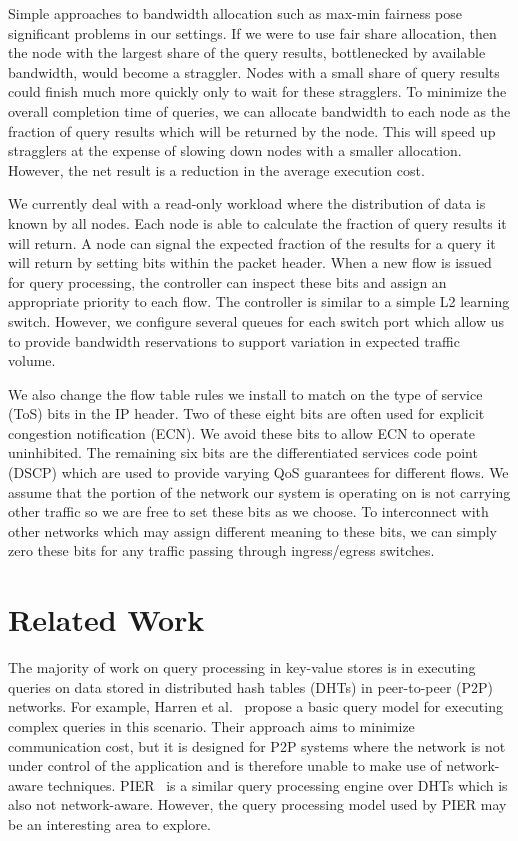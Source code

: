 \documentclass{sig-alternate-2013}
\begin{document}
Simple approaches to bandwidth allocation such as max-min fairness pose significant problems in our settings.
If we were to use fair share allocation, then the node with the largest share of the query results, bottlenecked by available bandwidth, would become a straggler.
Nodes with a small share of query results could finish much more quickly only to wait for these stragglers.
To minimize the overall completion time of queries, we can allocate bandwidth to each node as the fraction of query results which will be returned by the node.
This will speed up stragglers at the expense of slowing down nodes with a smaller allocation.
However, the net result is a reduction in the average execution cost.

We currently deal with a read-only workload where the distribution of data is known by all nodes.
Each node is able to calculate the fraction of query results it will return.
A node can signal the expected fraction of the results for a query it will return by setting bits within the packet header.
When a new flow is issued for query processing, the controller can inspect these bits and assign an appropriate priority to each flow.
The controller is similar to a simple L2 learning switch.
However, we configure several queues for each switch port which allow us to provide bandwidth reservations to support variation in expected traffic volume.

We also change the flow table rules we install to match on the type of service (ToS) bits in the IP header.
Two of these eight bits are often used for explicit congestion notification (ECN).
We avoid these bits to allow ECN to operate uninhibited.
The remaining six bits are the differentiated services code point (DSCP) which are used to provide varying QoS guarantees for different flows.
We assume that the portion of the network our system is operating on is not carrying other traffic so we are free to set these bits as we choose.
To interconnect with other networks which may assign different meaning to these bits, we can simply zero these bits for any traffic passing through ingress/egress switches.

\section{Related Work}

The majority of work on query processing in key-value stores is in executing queries on data stored in distributed hash tables (DHTs) in peer-to-peer (P2P) networks.
For example, Harren et al.~\cite{Harren2002} propose a basic query model for executing complex queries in this scenario.
Their approach aims to minimize communication cost, but it is designed for P2P systems where the network is not under control of the application and is therefore unable to make use of network-aware techniques.
PIER~\cite{Huebsch2005} is a similar query processing engine over DHTs which is also not network-aware.
However, the query processing model used by PIER may be an interesting area to explore.
\end{document}

